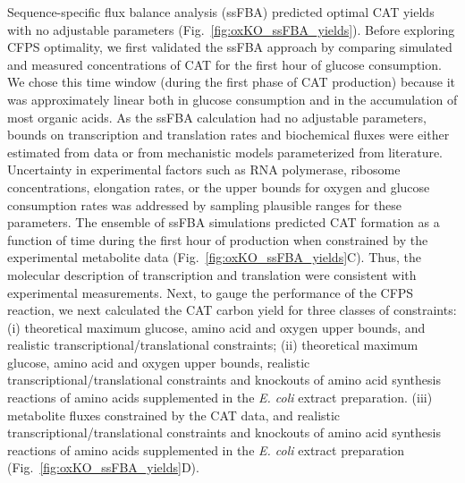 \documentclass[12pt]{article}
\begin{document}
Sequence-specific flux balance analysis (ssFBA) predicted optimal CAT yields with no adjustable parameters (Fig.~\ref{fig:oxKO_ssFBA_yields}).
Before exploring CFPS optimality, we first validated the ssFBA approach by comparing simulated and measured concentrations of CAT for the first hour of glucose consumption.
We chose this time window (during the first phase of CAT production) because it was approximately linear both in glucose consumption and in the accumulation of most organic acids.
As the ssFBA calculation had no adjustable parameters, bounds on transcription and translation rates and biochemical fluxes were either estimated from data or from mechanistic models parameterized from literature.
Uncertainty in experimental factors such as RNA polymerase, ribosome concentrations, elongation rates, or the upper bounds for oxygen and glucose consumption rates was addressed
by sampling plausible ranges for these parameters.
The ensemble of ssFBA simulations predicted CAT formation as a function of time during the first hour of production when constrained by the experimental metabolite data (Fig.~\ref{fig:oxKO_ssFBA_yields}C).
Thus, the molecular description of transcription and translation were consistent with experimental measurements.
Next, to gauge the performance of the CFPS reaction, we next calculated the CAT carbon yield for three classes of constraints:
(i) theoretical maximum glucose, amino acid and oxygen upper bounds, and realistic transcriptional/translational constraints;
(ii) theoretical maximum glucose, amino acid and oxygen upper bounds, realistic transcriptional/translational constraints and knockouts of amino acid synthesis reactions of amino acids supplemented in the \textit{E. coli} extract preparation.
(iii) metabolite fluxes constrained by the CAT data, and realistic transcriptional/translational constraints and knockouts of amino acid synthesis reactions of amino acids supplemented in the \textit{E. coli} extract preparation (Fig.~\ref{fig:oxKO_ssFBA_yields}D).
\end{document}
